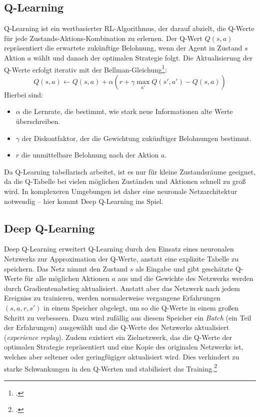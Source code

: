 \subsection{Q-Learning}
Q-Learning ist ein wertbasierter RL-Algorithmus, der darauf abzielt, die Q-Werte 
für jede Zustands-Aktions-Kombination zu erlernen. Der Q-Wert $Q(s,a)$ repräsentiert 
die erwartete zukünftige Belohnung, wenn der Agent in Zustand $s$ Aktion $a$ wählt 
und danach der optimalen Strategie folgt.
Die Aktualisierung der Q-Werte erfolgt iterativ mit der Bellman-Gleichung\footcite{qlearning}:
\begin{equation}
    Q(s,a) \leftarrow Q(s,a) + \alpha (r + \gamma \max_{a'}Q(s',a') - Q(s,a))
\end{equation}
Hierbei sind:
\begin{itemize}
    \item $\alpha$ die Lernrate, die bestimmt, wie stark neue Informationen alte Werte überschreiben.
    \item $\gamma$ der Diskontfaktor, der die Gewichtung zukünftiger Belohnungen bestimmt.
    \item $r$ die unmittelbare Belohnung nach der Aktion $a$.
\end{itemize}
Da Q-Learning tabellarisch arbeitet, ist es nur für kleine Zustandsräume geeignet, 
da die Q-Tabelle bei vielen möglichen Zuständen und Aktionen schnell zu groß wird. 
In komplexeren Umgebungen ist daher eine neuronale Netzarchitektur notwendig -- 
hier kommt Deep Q-Learning ins Spiel.

\subsection{Deep Q-Learning}
Deep Q-Learning erweitert Q-Learning durch den Einsatz eines neuronalen 
Netzwerks zur Approximation der Q-Werte, anstatt eine explizite Tabelle zu 
speichern. Das Netz nimmt den Zustand $s$ als Eingabe und gibt geschätzte Q-Werte 
für alle möglichen Aktionen $a$ aus und die Gewichte des Netzwerks werden durch 
Gradientenabstieg aktualisiert. Anstatt aber das Netzwerk nach jedem Ereigniss zu 
trainieren, werden normalerweise vergangene Erfahrungen $(s,a,r,s')$ in einem 
Speicher abgelegt, um so die Q-Werte in einem großen Schritt zu verbessern.
Dazu wird zufällig aus diesem Speicher ein \textit{Batch} (ein Teil der Erfahrungen) 
ausgewählt und die Q-Werte des Netzwerks aktualisiert (\textit{experience replay}).
Zudem existiert ein Zielnetzwerk, das die Q-Werte der optimalen Strategie 
repräsentiert und eine Kopie des originalen Netzwerks ist, welches aber seltener
oder geringfügiger aktualisiert wird. Dies verhindert zu starke Schwankungen in den 
Q-Werten und stabilisiert das Training.\footcite{mnih2013playingatarideepreinforcement}

